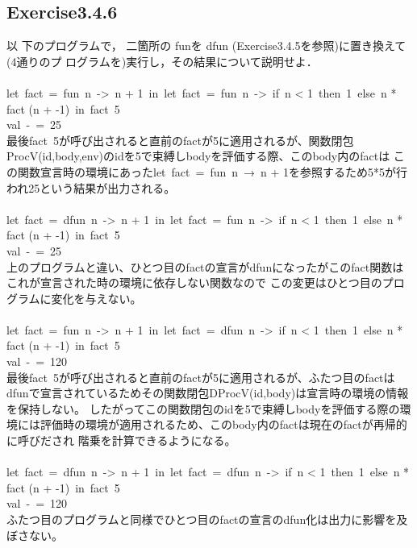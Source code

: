 \documentclass[a4paper,11pt,oneside,openany]{jsarticle}
\begin{document}
\subsection{Exercise3.4.6}
    以 下のプログラムで， 二箇所の funを dfun (Exercise3.4.5を参照)に置き換えて(4通りのプ ログラムを)実行し，その結果について説明せよ．\\\\

    let\ fact\ =\ fun\ n\ ->\ n + 1\ in\ let\ fact\ =\ fun\ n\ ->\ if\ n < 1\ then\ 1\ else\ n * fact (n + -1)\ in\ fact\ 5\\
    val\ -\ =\ 25\\
    最後fact\ 5が呼び出されると直前のfactが5に適用されるが、関数閉包ProcV(id,body,env)のidを5で束縛しbodyを評価する際、このbody内のfactは
    この関数宣言時の環境にあったlet\ fact\ =\ fun\ n\ →\ n + 1を参照するため5*5が行われ25という結果が出力される。\\\\ 

    let\ fact\ =\ dfun\ n\ ->\ n + 1\ in\ let\ fact\ =\ fun\ n\ ->\ if\ n < 1\ then\ 1\ else\ n * fact (n + -1)\ in\ fact\ 5\\
    val\ -\ =\ 25\\
    上のプログラムと違い、ひとつ目のfactの宣言がdfunになったがこのfact関数はこれが宣言された時の環境に依存しない関数なので
    この変更はひとつ目のプログラムに変化を与えない。\\\\ 

    let\ fact\ =\ fun\ n\ ->\ n + 1\ in\ let\ fact\ =\ dfun\ n\ ->\ if\ n < 1\ then\ 1\ else\ n * fact (n + -1)\ in\ fact\ 5\\
    val\ -\ =\ 120\\
    最後fact\ 5が呼び出されると直前のfactが5に適用されるが、ふたつ目のfactはdfunで宣言されているためその関数閉包DProcV(id,body)は宣言時の環境の情報を保持しない。
    したがってこの関数閉包のidを5で束縛しbodyを評価する際の環境には評価時の環境が適用されるため、このbody内のfactは現在のfactが再帰的に呼びだされ
    階乗を計算できるようになる。\\\\ 

    let\ fact\ =\ dfun\ n\ ->\ n + 1\ in\ let\ fact\ =\ dfun\ n\ ->\ if\ n < 1\ then\ 1\ else\ n * fact (n + -1)\ in\ fact\ 5\\
    val\ -\ =\ 120\\
    ふたつ目のプログラムと同様でひとつ目のfactの宣言のdfun化は出力に影響を及ぼさない。
\end{document}
